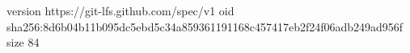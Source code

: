 version https://git-lfs.github.com/spec/v1
oid sha256:8d6b04b11b095dc5ebd5c34a859361191168c457417eb2f24f06adb249ad956f
size 84
